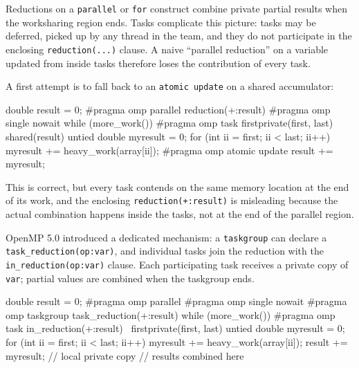 Reductions on a \texttt{parallel} or \texttt{for} construct combine private partial results when the worksharing region ends. Tasks complicate this picture: tasks may be deferred, picked up by any thread in the team, and they do not participate in the enclosing \texttt{reduction(...)} clause. A naive ``parallel reduction'' on a variable updated from inside tasks therefore loses the contribution of every task.

A first attempt is to fall back to an \texttt{atomic update} on a shared accumulator:

\begin{codeblock}[language = C, morekeywords={pragma}]
double result = 0;
#pragma omp parallel reduction(+:result)
{
    #pragma omp single nowait
    while (more_work()) {
        #pragma omp task firstprivate(first, last) shared(result) untied
        {
            double myresult = 0;
            for (int ii = first; ii < last; ii++)
                myresult += heavy_work(array[ii]);
            #pragma omp atomic update
            result += myresult;
        }
    }
}
\end{codeblock}

This is correct, but every task contends on the same memory location at the end of its work, and the enclosing \texttt{reduction(+:result)} is misleading because the actual combination happens inside the tasks, not at the end of the parallel region.

OpenMP 5.0 introduced a dedicated mechanism: a \texttt{taskgroup} can declare a \texttt{task\_reduction(op:var)}, and individual tasks join the reduction with the \texttt{in\_reduction(op:var)} clause. Each participating task receives a private copy of \texttt{var}; partial values are combined when the taskgroup ends.

\begin{codeblock}[language = C, morekeywords={pragma}]
double result = 0;
#pragma omp parallel
{
    #pragma omp single nowait
    {
        #pragma omp taskgroup task_reduction(+:result)
        {
            while (more_work()) {
                #pragma omp task in_reduction(+:result) \
                    firstprivate(first, last) untied
                {
                    double myresult = 0;
                    for (int ii = first; ii < last; ii++)
                        myresult += heavy_work(array[ii]);
                    result += myresult;   // local private copy
                }
            }
        } // results combined here
    }
}
\end{codeblock}

